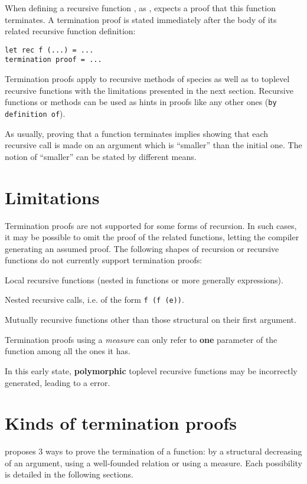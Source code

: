 
When defining a recursive function {\focal}, as {\coq}, expects a proof that
this function terminates. A termination proof is stated immediately after the
body of its related recursive function definition:

\noindent
{\scriptsize
\begin{lstlisting}
let rec f (...) = ...
termination proof = ...
\end{lstlisting}
}

Termination proofs apply to recursive methods of species as well as to toplevel
recursive functions with the limitations presented in the next section.
Recursive functions or methods can be used as {\zenon} hints in proofs like
any other ones (\lstinline"by definition of").

As usually, proving that a function terminates implies showing that each
recursive call is made on an argument which is ``smaller'' than the initial
one. The notion of ``smaller'' can be stated by different means.


\section{Limitations}
Termination proofs are not supported for some forms of recursion. In such
cases, it may be possible to omit the proof of the related functions, letting
the compiler generating an assumed proof. The following shapes of recursion
or recursive functions do not currently support termination proofs:

\begin{compact-itemize}
\item Local recursive functions (nested in functions or more generally
      expressions).
\item Nested recursive calls, i.e. of the form \lstinline"f (f (e))".
\item Mutually recursive functions other than those structural on their first
   argument.
\item Termination proofs using a {\em measure} can only refer to {\bf one}
   parameter of the function among all the ones it has.
\item In this early state, {\bf polymorphic} toplevel recursive functions
  may be incorrectly generated, leading to a {\coq} error.
\end{compact-itemize}


\section{Kinds of termination proofs}
{\focal} proposes 3 ways to prove the termination of a function: by a
structural decreasing of an argument, using a well-founded relation or
using a measure. Each possibility is detailed in the following sections.


